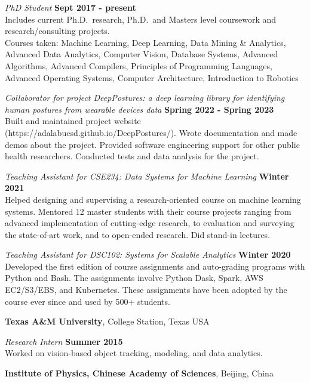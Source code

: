 \documentclass[margin,line]{res}
\begin{document}
\begin{resume}
\vspace{-.3cm}
{\em PhD Student} \hfill {\bf Sept 2017 - present}\\
Includes current Ph.D.~research, Ph.D.~and Masters level coursework and
research/consulting projects.\\
Courses taken: Machine Learning, Deep Learning, Data Mining \& Analytics, Advanced Data Analytics, Computer Vision, Database Systems, Advanced Algorithms, Advanced Compilers, Principles of Programming Languages, Advanced Operating Systems, Computer Architecture, Introduction to Robotics

{\em Collaborator for project DeepPostures: a deep learning library for identifying human postures from wearable devices data} \hfill {\bf Spring 2022 - Spring 2023}\\
Built and maintained project website (https://adalabucsd.github.io/DeepPostures/). Wrote documentation and made demos about the project. Provided software engineering support for other public health researchers. Conducted tests and data analysis for the project. 

{\em Teaching Assistant for CSE234: Data Systems for Machine Learning} \hfill {\bf Winter 2021}\\
Helped designing and supervising a research-oriented course on machine learning systems. Mentored 12 master students with their course projects ranging from advanced implementation of cutting-edge research, to evaluation and surveying the state-of-art work, and to open-ended research.  Did stand-in lectures.

{\em Teaching Assistant for DSC102: Systems for Scalable Analytics} \hfill {\bf Winter 2020}\\
Developed the first edition of course assignments and auto-grading programs with Python and Bash. The assignments involve Python Dask, Spark, AWS EC2/S3/EBS, and Kubernetes. These assignments have been adopted by the course ever since and used by 500+ students.



{\bf Texas A\&M University}, College Station, Texas USA

\vspace{-.3cm}
{\em Research Intern} \hfill {\bf Summer 2015}\\
Worked on vision-based object tracking, modeling, and data analytics.

{\bf Institute of Physics, Chinese Academy of Sciences}, Beijing, China


\end{resume}
\end{document}

